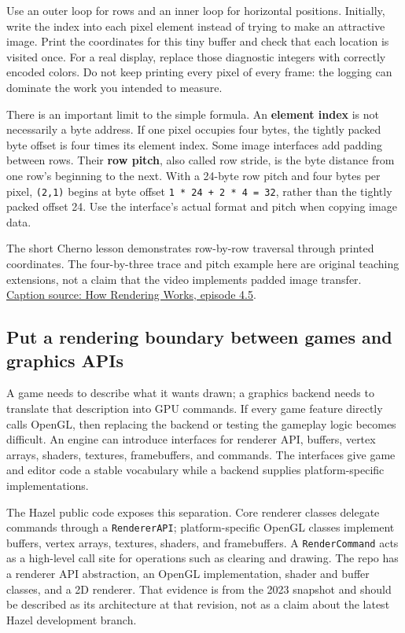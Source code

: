 Use an outer loop for rows and an inner loop for horizontal positions. Initially, write the index into each pixel element instead of trying to make an attractive image. Print the coordinates for this tiny buffer and check that each location is visited once. For a real display, replace those diagnostic integers with correctly encoded colors. Do not keep printing every pixel of every frame: the logging can dominate the work you intended to measure.

There is an important limit to the simple formula. An \textbf{element index} is not necessarily a byte address. If one pixel occupies four bytes, the tightly packed byte offset is four times its element index. Some image interfaces add padding between rows. Their \textbf{row pitch}, also called row stride, is the byte distance from one row's beginning to the next. With a 24-byte row pitch and four bytes per pixel, \texttt{(2,1)} begins at byte offset \texttt{1\ *\ 24\ +\ 2\ *\ 4\ =\ 32}, rather than the tightly packed offset 24. Use the interface's actual format and pitch when copying image data.

The short Cherno lesson demonstrates row-by-row traversal through printed coordinates. The four-by-three trace and pitch example here are original teaching extensions, not a claim that the video implements padded image transfer. \href{https://www.youtube.com/watch?v=6dOIju7--Jg}{Caption source: How Rendering Works, episode 4.5}.

\subsection{Put a rendering boundary between games and graphics APIs}\label{06-engine-ii-ch025-put-a-rendering-boundary-between-games-and-graphics-apis}

A game needs to describe what it wants drawn; a graphics backend needs to translate that description into GPU commands. If every game feature directly calls OpenGL, then replacing the backend or testing the gameplay logic becomes difficult. An engine can introduce interfaces for renderer API, buffers, vertex arrays, shaders, textures, framebuffers, and commands. The interfaces give game and editor code a stable vocabulary while a backend supplies platform-specific implementations.

The Hazel public code exposes this separation. Core renderer classes delegate commands through a \texttt{RendererAPI}; platform-specific OpenGL classes implement buffers, vertex arrays, textures, shaders, and framebuffers. A \texttt{RenderCommand} acts as a high-level call site for operations such as clearing and drawing. The repo has a renderer API abstraction, an OpenGL implementation, shader and buffer classes, and a 2D renderer. That evidence is from the 2023 snapshot and should be described as its architecture at that revision, not as a claim about the latest Hazel development branch.

